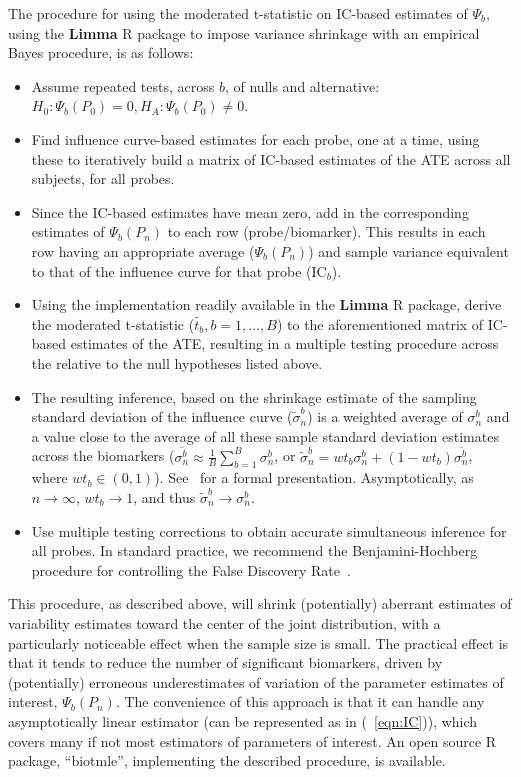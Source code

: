 The procedure for using the moderated t-statistic on IC-based estimates of
$\Psi_b$, using the \textbf{Limma} R package to impose variance shrinkage with
an empirical Bayes procedure, is as follows:

\begin{itemize}
\item Assume repeated tests, across $b$, of nulls and alternative:
    $H_0: \Psi_b(P_0) = 0, H_A: \Psi_b(P_0) \ne 0 $.
\item Find influence curve-based estimates for each probe, one at a time, using
    these to iteratively build a matrix of IC-based estimates of the ATE across
    all subjects, for all probes.
\item Since the IC-based estimates have mean zero, add in the corresponding
    estimates of $\Psi_b(P_n)$ to each row (probe/biomarker). This results in
    each row having an appropriate average ($\Psi_b(P_n)$) and sample variance
    equivalent to that of the influence curve for that probe ($\text{IC}_b$).
\item  Using the implementation readily available in the \textbf{Limma} R
    package, derive the moderated t-statistic ($ \tilde{t_b}, b = 1, \dots, B $)
    to the aforementioned matrix of IC-based estimates of the ATE, resulting in
    a multiple testing procedure across the relative to the null hypotheses
    listed above.
\item The resulting inference, based on the  shrinkage estimate of the
    sampling standard deviation of the influence curve ($\tilde{\sigma}^b_n$) is
    a weighted average of $\sigma^b_n$ and a value close to the average of all
    these sample standard deviation estimates across the biomarkers
    ($\overline{\sigma^b_n} \approx \frac{1}{B} \sum_{b = 1}^B \sigma^b_n$, or
    $\widetilde{\sigma}^b_n = wt_b \sigma^b_n+(1 - wt_b)\overline{\sigma^b_n}$,
    where $wt_b \in (0, 1)$). See~\cite{smyth2005limma} for a formal
    presentation. Asymptotically, as $n \rightarrow \infty$,
    $wt_b \rightarrow 1$, and thus
    $\widetilde{\sigma}^b_n \rightarrow \sigma^b_n$.
\item Use multiple testing corrections to obtain accurate simultaneous inference
    for all probes. In standard practice, we recommend the Benjamini-Hochberg
    procedure for controlling the False Discovery
    Rate~\cite{benjamini1995controlling}.
\end{itemize}

This procedure, as described above, will shrink (potentially) aberrant
estimates of variability estimates toward the center of the joint distribution,
with a particularly noticeable effect when the sample size is small. The
practical effect is that it tends to reduce the number of significant
biomarkers, driven by (potentially) erroneous underestimates of variation of
the parameter estimates of interest, $\Psi_b(P_n)$. The convenience of this
approach is that it can handle any asymptotically linear estimator (can be
represented as in (~\ref{eqn:IC})), which covers many if not most estimators of
parameters of interest. An open source R package, ``biotmle'', implementing the
described procedure, is available.
